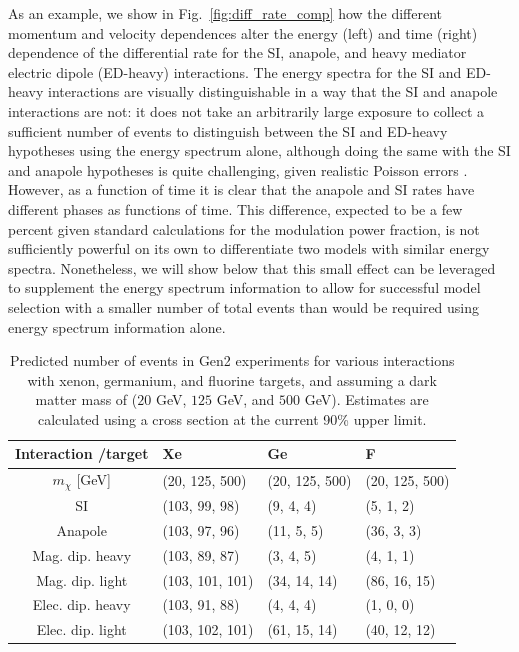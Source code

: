 \documentclass[11pt]{article}
\newcommand{\Fig}[1]{Fig.~\ref{#1}} \newcommand{\Figs}[2]{Figs.~\ref{#1} and \ref{#2}}
\begin{document}
As an example, we show in \Fig{fig:diff_rate_comp} how the different momentum and velocity dependences alter the energy (left) and time (right) dependence of the differential rate for the SI, anapole, and heavy mediator electric dipole (ED-heavy) interactions. The energy spectra for the SI and ED-heavy interactions are visually distinguishable in a way that the SI and anapole interactions are not: it does not take an arbitrarily large exposure to collect a sufficient number of events to distinguish between the SI and ED-heavy hypotheses using the energy spectrum alone, although doing the same with the SI and anapole hypotheses is quite challenging, given realistic Poisson errors \cite{Gluscevic:2015sqa}. However, as a function of time it is clear that the anapole and SI rates have different phases as functions of time. This difference, expected to be a few percent given standard calculations for the modulation power fraction, is not sufficiently powerful on its own to differentiate two models with similar energy spectra. Nonetheless, we will show below that this small effect can be leveraged to supplement the energy spectrum information to allow for successful model selection with a smaller number of total events than would be required using energy spectrum information alone.




\begin{table}[t] 
\setlength{\extrarowheight}{3pt}
\setlength{\tabcolsep}{12pt}
\begin{center}
\begin{tabular}{c||m{3cm}|m{3cm}|m{3cm}}
Interaction /target & Xe & Ge & F\\
\hline\hline 
$m_\chi$ [GeV] & (20, 125, 500) & (20, 125, 500) & (20, 125, 500) \\
\hline\hline 
SI& (103, 99, 98) & (9, 4, 4)& (5, 1, 2)\\ \hline
Anapole& (103, 97, 96)& (11, 5, 5)& (36, 3, 3)\\ \hline
Mag. dip. heavy& (103, 89, 87)& (3, 4, 5)& (4, 1, 1)\\ \hline
Mag. dip. light& (103, 101, 101)& (34, 14, 14)& (86, 16, 15)\\ \hline
Elec. dip. heavy& (103, 91, 88)& (4, 4, 4)& (1, 0, 0)\\ \hline
Elec. dip. light& (103, 102, 101)& (61, 15, 14)& (40, 12, 12)\\ \hline \hline
\end{tabular}
\end{center}
\caption{Predicted number of events in Gen2 experiments for various interactions with xenon, germanium, and fluorine targets, and assuming a dark matter mass of ($20$ GeV, $125$ GeV, and $500$ GeV). Estimates are calculated using a cross section at the current 90\% upper limit.}
\label{tab:pred_events}
\end{table}
\end{document}
